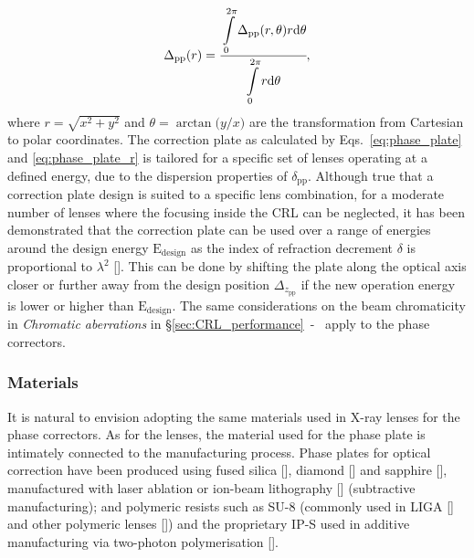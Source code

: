 \begin{refsection}
\begin{equation}\label{eq:phase_plate_r}
   \Delta_\text{pp}(r)=\cfrac{\displaystyle\int\limits_{0}^{2\pi}{\Delta_\text{pp}(r,\theta)r\text{d}\theta}}{\displaystyle\int\limits_{0}^{2\pi}{r\text{d}\theta}},
\end{equation}
where $r=\sqrt{x^2 + y^2}$ and $\theta=\arctan{\big(y/x\big)}$ are the transformation from Cartesian to polar coordinates. The correction plate as calculated by Eqs.~\ref{eq:phase_plate} and \ref{eq:phase_plate_r} is tailored for a specific set of lenses operating at a defined energy, due to the dispersion properties of $\delta_\text{pp}$. Although true that a correction plate design is suited to a specific lens combination, for a moderate number of lenses where the focusing inside the CRL can be neglected, it has been demonstrated that the correction plate can be used over a range of energies around the design energy $\text{E}_\text{design}$ as the index of refraction decrement $\delta$ is proportional to $\lambda^2$ [\cite[\textit{\S6}]{Seiboth2018}]. This can be done by shifting the plate along the optical axis closer or further away from the design position $\Delta_{z_\text{pp}}$ if the new operation energy is lower or higher than $\text{E}_\text{design}$. The same considerations on the beam chromaticity in \textit{Chromatic aberrations} in \S\ref{sec:CRL_performance}~-~\textit{} apply to the phase correctors. 


\subsubsection*{Materials}

It is natural to envision adopting the same materials used in X-ray lenses for the phase correctors. As for the lenses, the material used for the phase plate is intimately connected to the manufacturing process. Phase plates for optical correction have been produced using fused silica [\cite{Seiboth2017}], diamond [\cite{Polikarpov2016, Antipov2020}] and sapphire [\cite{Lin2020}], manufactured with laser ablation or ion-beam lithography [\cite{Medvedskaya2020}] (subtractive manufacturing); and polymeric resists such as SU-8 (commonly used in LIGA [\cite{Nazmov2004}] and other polymeric lenses [\cite{Stohr2015}]) and the proprietary IP-S used in additive manufacturing via two-photon polymerisation [\cite{Petrov2017, Sanli2018, Abrashitova2020,Lin2020}]. 



\end{refsection}
